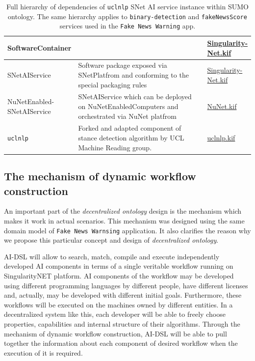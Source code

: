\documentclass[]{report}
\begin{document}
\begin{table}[H]
\begin{tabular}{p{0.2\linewidth}|p{0.7\linewidth}|p{0.1\linewidth}|}
    \hline
    SoftwareContainer &
    &
    \href{https://github.com/singnet/ai-dsl/blob/master/ontology/
    SingulairtyNet.kif}{Singularity-Net.kif}\\
    \hline
    SNetAIService &
    Software package exposed via SNetPlatfrom and conforming to the special
    packaging rules &
    \href{https://github.com/singnet/ai-dsl/blob/master/ontology/    SingulairtyNet.kif}{Singularity-Net.kif}\\
    \hline
    NuNetEnabled-SNetAIService &
    SNetAIService which can be deployed on NuNetEnabledComputers and
    orchestrated via NuNet platfrom &
    \href{https://github.com/singnet/ai-dsl/blob/master/ontology/    NuNet.kif}{NuNet.kif}\\
    \hline
    \quad \texttt{uclnlp} &
    Forked and adapted component of stance detection algorithm by UCL Machine
    Reading group. &
    \href{https://github.com/singnet/ai-dsl/blob/master/ontology/    uclnp.kif}{uclnlp.kif}
  \end{tabular}
\captionsetup{width=0.9\linewidth}
\caption{\label{tbl:uclnlp_hierarchy}Full hierarchy of dependencies of
\texttt{uclnlp} SNet AI service instance within SUMO ontology. The same
hierarchy applies to \texttt{binary-detection} and \texttt{fakeNewsScore} services used
in the \texttt{Fake News Warning} app.}
\end{table}

\subsection{The mechanism of dynamic workflow construction}

An important part of the \textit{decentralized ontology} design is the mechanism
which makes it work in actual scenarios. This mechanism was designed using the
same domain model of \texttt{Fake News Warnsing} application. It also clarifies
the reason why we propose this particular concept and design of
\textit{decentralized ontology}. 

AI-DSL will allow to search, match, compile and
execute independently developed AI components in terms of a single veritable
workflow running on SingularityNET platform. AI components of the workflow may
be developed using different programming languages by different people, 
have different licenses and, actually, may be developed with different initial
goals. Furthermore, these workflows will be executed on the machines owned by 
different entities. In a decentralized system like this, each developer will be
able to freely choose properties, capabilities and internal structure of their
algorithms. Through the mechanism of dynamic workflow construction, AI-DSL will
be able to pull together the information about each component of desired workflow
when the execution of it is required.
\end{document}
